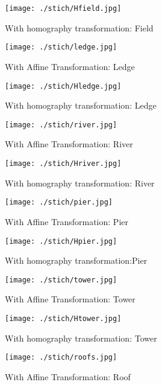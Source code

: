 \documentclass[10pt,letterpaper]{article}
\begin{document}
\begin{figure}[h]
\centering
\texttt{[image: ./stich/Hfield.jpg]} 
\caption{\label{fig:dummy} With homography transformation: Field}
\end{figure}

\begin{figure}[h]
\centering
\texttt{[image: ./stich/ledge.jpg]} 
\caption{\label{fig:dummy} With Affine Transformation: Ledge}
\end{figure}

\begin{figure}[h]
\centering
\texttt{[image: ./stich/Hledge.jpg]} 
\caption{\label{fig:dummy}  With homography transformation: Ledge}
\end{figure}

\begin{figure}[h]
\centering
\texttt{[image: ./stich/river.jpg]} 
\caption{\label{fig:dummy} With Affine Transformation: River}
\end{figure}

\begin{figure}[h]
\centering
\texttt{[image: ./stich/Hriver.jpg]} 
\caption{\label{fig:dummy}  With homography transformation: River}
\end{figure}   

\begin{figure}[h]
\centering
\texttt{[image: ./stich/pier.jpg]} 
\caption{\label{fig:dummy} With Affine Transformation: Pier}
\end{figure}

\begin{figure}[h]
\centering
\texttt{[image: ./stich/Hpier.jpg]} 
\caption{\label{fig:dummy}  With homography transformation:Pier}
\end{figure}

\begin{figure}[h]
\centering
\texttt{[image: ./stich/tower.jpg]} 
\caption{\label{fig:dummy} With Affine Transformation: Tower}
\end{figure}

\begin{figure}[h]
\centering
\texttt{[image: ./stich/Htower.jpg]} 
\caption{\label{fig:dummy} With homography transformation: Tower}
\end{figure}

\begin{figure}[h]
\centering
\texttt{[image: ./stich/roofs.jpg]} 
\caption{\label{fig:dummy} With Affine Transformation: Roof}
\end{figure}
\end{document}
